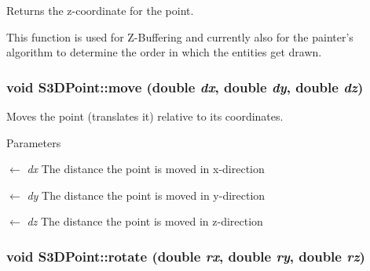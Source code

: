 Returns the z-\/coordinate for the point. 

This function is used for Z-\/Buffering and currently also for the painter's algorithm to determine the order in which the entities get drawn. \hypertarget{class_s3_d_point_a18bbc742cbadc8d49d0600c3f80caf91}{
\subsubsection[{move}]{\setlength{\rightskip}{0pt plus 5cm}void S3DPoint::move (double {\em dx}, \/  double {\em dy}, \/  double {\em dz})}}
\label{class_s3_d_point_a18bbc742cbadc8d49d0600c3f80caf91}


Moves the point (translates it) relative to its coordinates. 


\begin{DoxyParams}{Parameters}
\item[\mbox{$\leftarrow$} {\em dx}]The distance the point is moved in x-\/direction \item[\mbox{$\leftarrow$} {\em dy}]The distance the point is moved in y-\/direction \item[\mbox{$\leftarrow$} {\em dz}]The distance the point is moved in z-\/direction \end{DoxyParams}
\hypertarget{class_s3_d_point_a4d51ed60f8d2e7ee2edd060cfdef22d4}{
\subsubsection[{rotate}]{\setlength{\rightskip}{0pt plus 5cm}void S3DPoint::rotate (double {\em rx}, \/  double {\em ry}, \/  double {\em rz})}}
\label{class_s3_d_point_a4d51ed60f8d2e7ee2edd060cfdef22d4}


